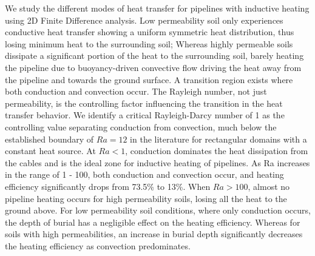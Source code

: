 \documentclass[Journal,letterpaper,InsideFigs]{ascelike-new}
\begin{document}
We study the different modes of heat transfer for pipelines with inductive heating using 2D Finite Difference analysis. Low permeability soil only experiences conductive heat transfer showing a uniform symmetric heat distribution, thus losing minimum heat to the surrounding soil;  Whereas highly permeable soils dissipate a significant portion of the heat to the surrounding soil, barely heating the pipeline due to buoyancy-driven convective flow driving the heat away from the pipeline and towards the ground surface. A transition region exists where both conduction and convection occur. The Rayleigh number, not just permeability, is the controlling factor influencing the transition in the heat transfer behavior. We identify a critical Rayleigh-Darcy number of 1 as the controlling value separating conduction from convection, much below the established boundary of $Ra = 12$ in the literature for rectangular domains with a constant heat source. At $Ra < 1$, conduction dominates the heat dissipation from the cables and is the ideal zone for inductive heating of pipelines. As Ra increases in the range of 1 - 100, both conduction and convection occur, and heating efficiency significantly drops from 73.5\% to 13\%. When $Ra > 100$, almost no pipeline heating occurs for high permeability soils, losing all the heat to the ground above. For low permeability soil conditions, where only conduction occurs, the depth of burial has a negligible effect on the heating efficiency. Whereas for soils with high permeabilities, an increase in burial depth significantly decreases the heating efficiency as convection predominates.
\pagebreak
%
\appendix
%
\end{document}
